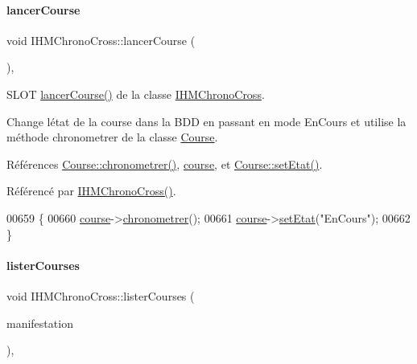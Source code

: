 \paragraph{\texorpdfstring{lancer\+Course}{lancerCourse}}
{\footnotesize\ttfamily void I\+H\+M\+Chrono\+Cross\+::lancer\+Course (\begin{DoxyParamCaption}{ }\end{DoxyParamCaption})\hspace{0.3cm}{\ttfamily [private]}, {\ttfamily [slot]}}



S\+L\+OT \hyperlink{class_i_h_m_chrono_cross_ace90922ce4c4ffeed6f1e8eb84c8c7a5}{lancer\+Course()} de la classe \hyperlink{class_i_h_m_chrono_cross}{I\+H\+M\+Chrono\+Cross}. 

Change l\textquotesingle{}état de la course dans la B\+DD en passant en mode En\+Cours et utilise la méthode chronometrer de la classe \hyperlink{class_course}{Course}. 

Références \hyperlink{class_course_a589447dd63dca89395119ffd4e4a8c8c}{Course\+::chronometrer()}, \hyperlink{class_i_h_m_chrono_cross_a03a8226c0e7f423d29302d9a06284ab4}{course}, et \hyperlink{class_course_a3ebcde1fa443cb20d71fb98af4d0c418}{Course\+::set\+Etat()}.



Référencé par \hyperlink{class_i_h_m_chrono_cross_a479fc90733fba3e65fb06aa4a3adc02e}{I\+H\+M\+Chrono\+Cross()}.


\begin{DoxyCode}
00659 \{
00660     \hyperlink{class_i_h_m_chrono_cross_a03a8226c0e7f423d29302d9a06284ab4}{course}->\hyperlink{class_course_a589447dd63dca89395119ffd4e4a8c8c}{chronometrer}();
00661     \hyperlink{class_i_h_m_chrono_cross_a03a8226c0e7f423d29302d9a06284ab4}{course}->\hyperlink{class_course_a3ebcde1fa443cb20d71fb98af4d0c418}{setEtat}(\textcolor{stringliteral}{"EnCours"});
00662 \}
\end{DoxyCode}
\mbox{\label{class_i_h_m_chrono_cross_a1b9f117d7097b63ddabe168a5349a7e8}} 
\paragraph{\texorpdfstring{lister\+Courses}{listerCourses}}
{\footnotesize\ttfamily void I\+H\+M\+Chrono\+Cross\+::lister\+Courses (\begin{DoxyParamCaption}\item[{Q\+String}]{manifestation }\end{DoxyParamCaption})\hspace{0.3cm}{\ttfamily [private]}, {\ttfamily [slot]}}




